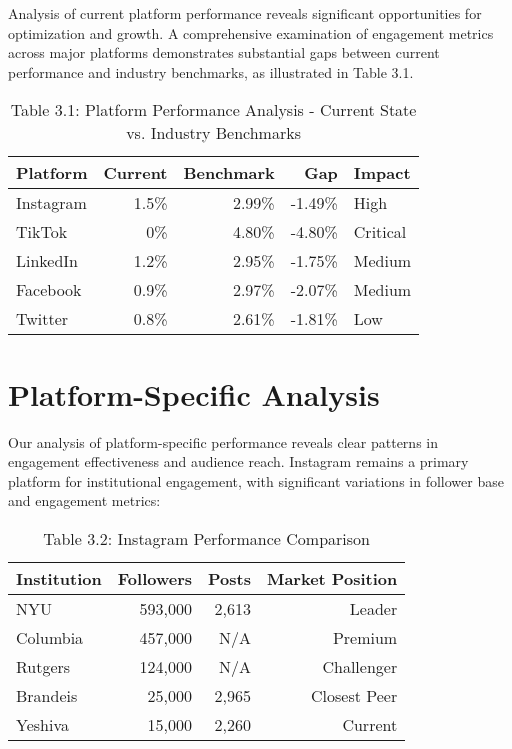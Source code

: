 \documentclass[12pt]{report}
\begin{document}
Analysis of current platform performance reveals significant opportunities for optimization and growth. A comprehensive examination of engagement metrics across major platforms demonstrates substantial gaps between current performance and industry benchmarks, as illustrated in Table 3.1.

\begin{table}[h]
\centering
\caption{Table 3.1: Platform Performance Analysis - Current State vs. Industry Benchmarks}
\begin{tabular}{@{}lrrrl@{}}
\toprule
\textbf{Platform} & \textbf{Current} & \textbf{Benchmark} & \textbf{Gap} & \textbf{Impact} \\
\midrule
Instagram & 1.5\% & 2.99\% & -1.49\% & High \\
TikTok & 0\% & 4.80\% & -4.80\% & Critical \\
LinkedIn & 1.2\% & 2.95\% & -1.75\% & Medium \\
Facebook & 0.9\% & 2.97\% & -2.07\% & Medium \\
Twitter & 0.8\% & 2.61\% & -1.81\% & Low \\
\bottomrule
\end{tabular}
\end{table}

\section{Platform-Specific Analysis}

Our analysis of platform-specific performance reveals clear patterns in engagement effectiveness and audience reach. Instagram remains a primary platform for institutional engagement, with significant variations in follower base and engagement metrics:

\begin{table}[h]
\centering
\caption{Table 3.2: Instagram Performance Comparison}
\begin{tabular}{@{}lrrr@{}}
\toprule
\textbf{Institution} & \textbf{Followers} & \textbf{Posts} & \textbf{Market Position} \\
\midrule
NYU & 593,000 & 2,613 & Leader \\
Columbia & 457,000 & N/A & Premium \\
Rutgers & 124,000 & N/A & Challenger \\
Brandeis & 25,000 & 2,965 & Closest Peer \\
Yeshiva & 15,000 & 2,260 & Current \\
\bottomrule
\end{tabular}
\end{table}
\end{document}
